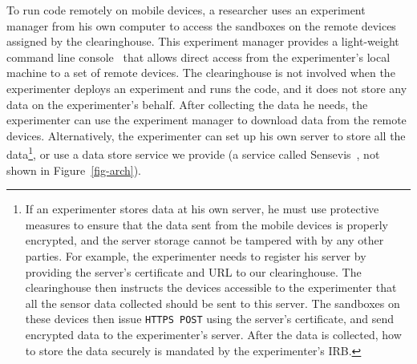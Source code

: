 To run code remotely on mobile devices, a researcher uses an
experiment manager from his own computer 
to access the sandboxes on the remote devices assigned by the clearinghouse. 
This experiment manager provides a light-weight command line 
console~\cite{demo-kit} that allows direct access from the 
experimenter's local machine to a set of remote devices. 
The clearinghouse is not involved when the experimenter deploys 
an experiment and runs the code, and it does not store any
data on the experimenter's behalf. After collecting the data he needs, the
experimenter can use the experiment manager to download data from the remote devices. 
Alternatively, the experimenter can set up his own server to store all 
the data\footnote{\scriptsize
If an experimenter stores data at his own server, he must use protective
measures to ensure that the data sent from the mobile devices is
properly encrypted, and the server storage cannot be tampered
with by any other parties. For example, the experimenter needs to register
his server by providing the server's certificate and URL to our
clearinghouse. The clearinghouse then instructs the devices
accessible to the experimenter that all the sensor data collected should be
sent to this server. The sandboxes on these devices then issue
\texttt{HTTPS POST} using the server's certificate, and send encrypted
data to the experimenter's server. After the data is collected, how to store
the data securely is mandated by the experimenter's IRB.}, or use a data 
store service we provide (a service called Sensevis~\cite{sensevis}, 
not shown in Figure~\ref{fig-arch}).

